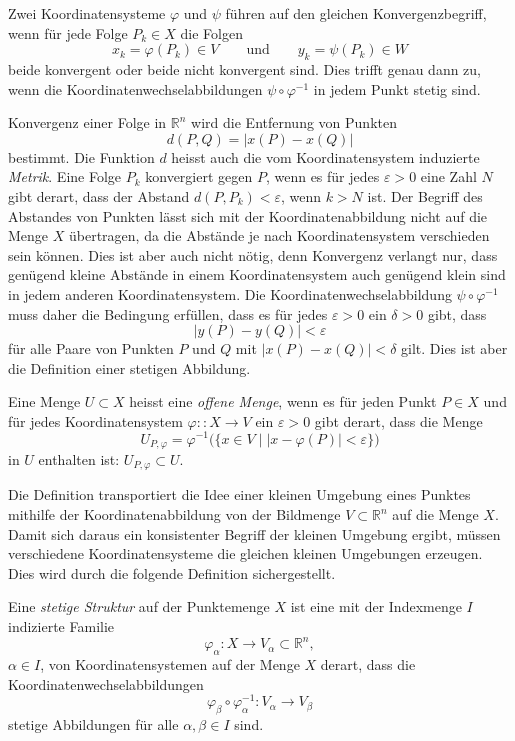 Zwei Koordinatensysteme $\varphi$ und $\psi$ führen auf den gleichen
Konvergenzbegriff, wenn für jede Folge $P_k\in X$ die Folgen
\[
x_k=\varphi(P_k)\in V
\qquad\text{und}\qquad
y_k=\psi(P_k)\in W
\]
beide konvergent oder beide nicht konvergent sind.
Dies trifft genau dann zu, wenn die Koordinatenwechselabbildungen
$\psi\circ\varphi^{-1}$ in jedem Punkt stetig sind.

Konvergenz einer Folge in $\mathbb{R}^n$ wird die Entfernung von Punkten 
\[
d(P,Q)
=
|x(P)-x(Q)|
\]
bestimmt.
Die Funktion $d$ heisst auch die vom Koordinatensystem induzierte 
{\em Metrik}.
%
Eine Folge $P_k$ konvergiert gegen $P$, wenn es für jedes $\varepsilon>0$
eine Zahl $N$ gibt derart, dass der Abstand $d(P,P_k)<\varepsilon$, wenn
$k>N$ ist.
Der Begriff des Abstandes von Punkten lässt sich mit der Koordinatenabbildung
nicht auf die Menge $X$ übertragen, da die Abstände je nach Koordinatensystem
verschieden sein können.
Dies ist aber auch nicht nötig, denn Konvergenz verlangt nur, dass genügend
kleine Abstände in einem Koordinatensystem auch genügend klein sind in jedem
anderen Koordinatensystem.
Die Koordinatenwechselabbildung $\psi\circ\varphi^{-1}$  muss daher die
Bedingung erfüllen, dass es für jedes $\varepsilon>0$ ein $\delta>0$ gibt,
dass 
\[
|y(P)-y(Q)| < \varepsilon
\]
für alle Paare von Punkten $P$ und $Q$ mit $|x(P)-x(Q)| < \delta$
gilt.
Dies ist aber die Definition einer stetigen Abbildung.

\begin{definition}
\label{buch:koordinaten:koordinaten:definition:offenemenge}
Eine Menge $U\subset X$ heisst eine {\em offene Menge}, wenn es für jeden Punkt
%
%
$P\in X$ und für jedes Koordinatensystem $\varphi:\colon X\to V$
ein $\varepsilon >0$ gibt derart, dass die Menge
\[
U_{P,\varphi}
=
\varphi^{-1}\bigl(
\{
x\in V
\mid
|x-\varphi(P)|<\varepsilon
\}
\bigr)
\]
in $U$ enthalten ist: $U_{P,\varphi}\subset U$.
\end{definition}

Die Definition transportiert die Idee einer kleinen Umgebung
eines Punktes mithilfe der Koordinatenabbildung von der Bildmenge
$V\subset \mathbb{R}^n$ auf die Menge $X$.
Damit sich daraus ein konsistenter Begriff der kleinen Umgebung 
ergibt, müssen verschiedene Koordinatensysteme die gleichen
kleinen Umgebungen erzeugen.
Dies wird durch die folgende Definition sichergestellt.

\begin{definition}
\label{buch:koordinaten:koordinaten:definition:stetigestruktur}
%
%
Eine {\em stetige Struktur} auf der Punktemenge $X$ ist eine mit
der Indexmenge $I$ indizierte Familie
\[
\varphi_\alpha\colon X\to V_\alpha \subset \mathbb{R}^n,
\]
$\alpha\in I$,
von Koordinatensystemen auf der Menge $X$ derart, dass die
Koordinatenwechselabbildungen
\[
\varphi_{\beta}\circ\varphi_\alpha^{-1}
\colon
V_\alpha \to V_\beta
\]
stetige Abbildungen für alle $\alpha,\beta\in I$ sind.
\end{definition}

